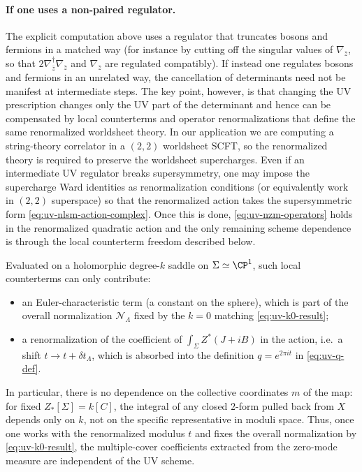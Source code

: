 \documentclass[12pt]{article}
\begin{document}
\paragraph{If one uses a non-paired regulator.}
The explicit computation above uses a regulator that truncates bosons and
fermions in a matched way (for instance by cutting off the singular values of
$\nabla_{\bar z}$, so that $2\nabla_{\bar z}^\dagger\nabla_{\bar z}$ and
$\nabla_{\bar z}$ are regulated compatibly). If instead one regulates bosons
and fermions in an unrelated way, the cancellation of determinants need not be
manifest at intermediate steps. The key point, however, is that changing the UV
prescription changes only the UV part of the determinant and hence can be
compensated by local counterterms and operator renormalizations that define the
same renormalized worldsheet theory. In our application we are computing a
string-theory correlator in a $(2,2)$ worldsheet SCFT, so the renormalized
theory is required to preserve the worldsheet supercharges. Even if an
intermediate UV regulator breaks supersymmetry, one may impose the supercharge
Ward identities as renormalization conditions (or equivalently work in $(2,2)$
superspace) so that the renormalized action takes the supersymmetric form
\eqref{eq:uv-nlsm-action-complex}. Once this is done, \eqref{eq:uv-nzm-operators}
holds in the renormalized quadratic action and the only remaining scheme
dependence is through the local counterterm freedom described below.

Evaluated on a holomorphic degree-$k$ saddle on $\Sigma\simeq\CP^1$, such local
counterterms can only contribute:
\begin{itemize}
\item an Euler-characteristic term (a constant on the sphere), which is part of
  the overall normalization $\mathcal{N}_\Lambda$ fixed by the $k=0$ matching
  \eqref{eq:uv-k0-result};
\item a renormalization of the coefficient of $\int_\Sigma Z^*(J+iB)$ in the
  action, i.e.\ a shift $t\to t+\delta t_\Lambda$, which is absorbed into the
  definition $q=e^{2\pi i t}$ in \eqref{eq:uv-q-def}.
\end{itemize}
In particular, there is no dependence on the collective coordinates $m$ of the
map: for fixed $Z_*[\Sigma]=k[C]$, the integral of any closed $2$-form pulled
back from $X$ depends only on $k$, not on the specific representative in moduli
space. Thus, once one works with the renormalized modulus $t$ and fixes the
overall normalization by \eqref{eq:uv-k0-result}, the multiple-cover
coefficients extracted from the zero-mode measure are independent of the UV
scheme.
\end{document}
